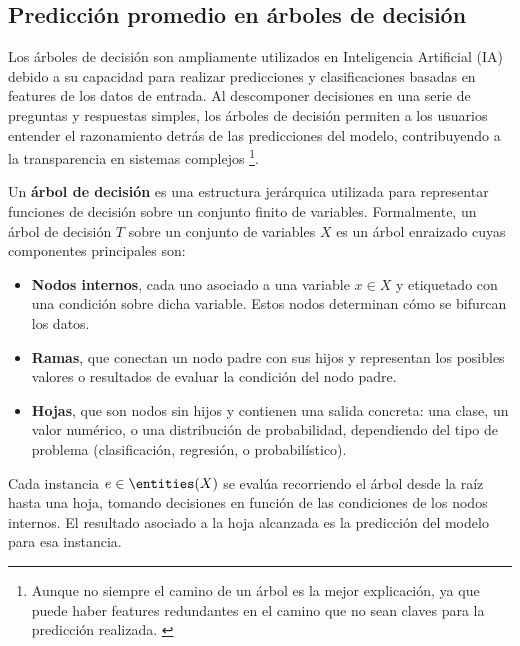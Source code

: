 
\subsection{Predicción promedio en árboles de decisión}

Los árboles de decisión son ampliamente utilizados en Inteligencia Artificial (IA) debido a su capacidad para realizar predicciones y clasificaciones basadas en features de los datos de entrada. Al descomponer decisiones en una serie de preguntas y respuestas simples, los árboles de decisión permiten a los usuarios entender el razonamiento detrás de las predicciones del modelo, contribuyendo a la transparencia en sistemas complejos \footnote{Aunque no siempre el camino de un árbol es la mejor explicación, ya que puede haber features redundantes en el camino que no sean claves para la predicción realizada. \cite{audemard2021explanatorypowerdecisiontrees}}.

\begin{definition}
Un \textbf{árbol de decisión} es una estructura jerárquica utilizada para representar funciones de decisión sobre un conjunto finito de variables. Formalmente, un árbol de decisión \(T\) sobre un conjunto de variables \(X\) es un árbol enraizado cuyas componentes principales son:

\begin{itemize}
    \item \textbf{Nodos internos}, cada uno asociado a una variable \(x \in X\) y etiquetado con una condición sobre dicha variable. Estos nodos determinan cómo se bifurcan los datos.
    
    \item \textbf{Ramas}, que conectan un nodo padre con sus hijos y representan los posibles valores o resultados de evaluar la condición del nodo padre.
    
    \item \textbf{Hojas}, que son nodos sin hijos y contienen una salida concreta: una clase, un valor numérico, o una distribución de probabilidad, dependiendo del tipo de problema (clasificación, regresión, o probabilístico).
\end{itemize}

Cada instancia \(e \in \entities(X)\) se evalúa recorriendo el árbol desde la raíz hasta una hoja, tomando decisiones en función de las condiciones de los nodos internos. El resultado asociado a la hoja alcanzada es la predicción del modelo para esa instancia.

\end{definition}

